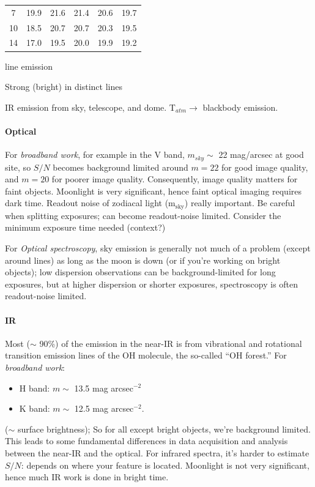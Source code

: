 \documentclass[12pt]{article}
\newcommand{\mynotes}[1]{\textcolor{myBlue}{#1}}
\begin{document}
\begin{description}[style=nextline]
\begin{center}
\begin{tabular}{c c c c c c}
                7 & 19.9 & 21.6 & 21.4 & 20.6 & 19.7\\
                10 & 18.5 & 20.7 & 20.7 & 20.3 & 19.5\\
                14 & 17.0 & 19.5 & 20.0 & 19.9 & 19.2\\
            \end{tabular}
        \end{center}
    \item [aurorae] line emission
    \item [light pollution] Strong (bright) in distinct lines
    \item [unresolved stars and galaxies]
    \item [thermal emission] IR emission from sky,
        telescope, and dome.
        T$_{atm} \rightarrow$ blackbody emission.
\end{description}

\paragraph{Optical}
For \textit{broadband work}, for example in the V band, $m_{sky}\sim$ 22
mag/arcsec at good site, so $S/N$ becomes background limited around $m=22$ for
good image quality, and $m=20$ for poorer image quality. Consequently, image
quality matters for faint objects. Moonlight is very significant, hence faint
optical imaging requires dark time. \mynotes {Readout noise of zodiacal light
(m$_{\mathrm{sky}}$) really important. Be careful when splitting exposures; can
become readout-noise limited. Consider the minimum exposure time needed
(context?)}

For \textit{Optical spectroscopy}, sky emission is generally not much of a
problem (except around lines) as long as the moon is down (or if you're working on
bright objects); low dispersion observations can be background-limited for long
exposures, but at higher dispersion or shorter exposures, spectroscopy is often
readout-noise limited.

\paragraph{IR}
Most ($\sim$ 90\%) of the emission in the near-IR is from vibrational and
rotational transition emission lines of the OH molecule, the so-called ``OH
forest.'' For \textit{broadband work}:
\begin{itemize}
    \item H band: $m\sim$ 13.5 mag arcsec$^{-2}$
    \item K band: $m\sim$ 12.5 mag arcsec$^{-2}$.
\end{itemize}
($\sim$ surface brightness);
So for all except bright objects, we're background limited. This leads to some
fundamental differences in data acquisition and analysis between the near-IR
and the optical. For infrared spectra, it's harder to estimate $S/N$: depends
on where your feature is located. Moonlight is not very significant, hence much
IR work is done in bright time.
\end{document}
